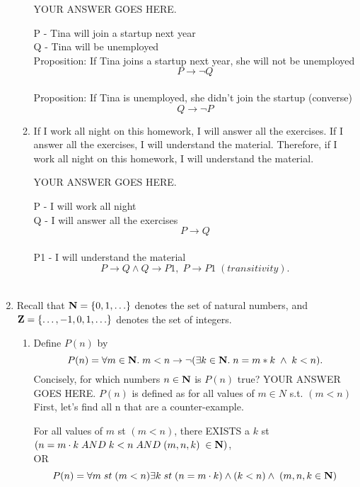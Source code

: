 \documentclass{article}
\begin{document}
\begin{enumerate}
\begin{enumerate}
YOUR ANSWER GOES HERE.

P - Tina will join a startup next year \\
Q - Tina will be unemployed \\
Proposition: If Tina joins a startup next year, she will not be unemployed \\
\[ P \to \neg Q \] \\
Proposition: If Tina is unemployed, she didn't join the startup (converse)\\
\[ Q \to \neg P \]

\item If I work all night on this homework, I will answer all the
exercises. If I answer all the exercises, I will understand the
material. Therefore, if I work all night on this homework, I will
understand the material.

YOUR ANSWER GOES HERE.

P - I will work all night \\
Q - I will answer all the exercises \\
\[ P \to Q \] \\
P1 - I will understand the material \\
\[ P \to Q \wedge Q \to P1, \; P \to P1 \; (transitivity). \] \\

\end{enumerate}


\item
Recall that $\mbox{{\bfseries N}}=\{0,1,\ldots\}$ denotes the set of natural numbers,
and $\mbox{{\bfseries Z}}=\{\ldots,-1,0,1,\ldots\}$ denotes the set of integers.

\begin{enumerate}

\item Define $P(n)$ by
\[ P(n) = \forall m \in \mbox{{\bfseries N}} . \; m<n \to
\neg (\exists k \in \mbox{{\bfseries N}} . \; n=m*k \; \wedge \; k<n). \]
Concisely, for which numbers $n\in\mbox{{\bfseries N}}$ is $P(n)$ true?
\newline
YOUR ANSWER GOES HERE.
\newline \newline
$P(n)$ is defined as for all values of $m \in N$ s.t. $(m<n)$ \\

First, let's find all n that are a counter-example.

For all values of  $m$  st $(m<n)$, there EXISTS a $k$ st \\
$(n=m \cdot k \; AND \; k<n \; AND \; (m, n, k) \; \in \mbox{{\bfseries N}})$,
\\  OR \\
\[ P(n)= \forall m \; st  \; (m<n) 
\exists k \; st \; (n=m \cdot k) \wedge (k<n) \wedge \; (m, n, k \in\mbox{{\bfseries N}}) \] 


\end{enumerate}
\end{enumerate}
\end{document}
